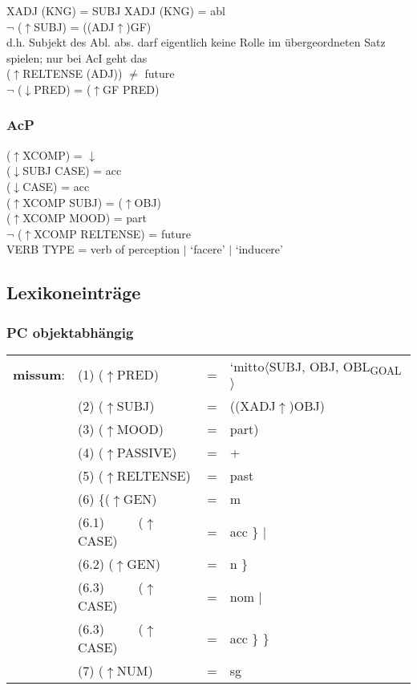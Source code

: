 \documentclass[12pt,a4paper]{article}
\begin{document}
XADJ (KNG) = SUBJ XADJ (KNG) = abl\\
$\neg$ ($\uparrow$SUBJ) = ((ADJ$\uparrow$)GF) \\
d.h. Subjekt des Abl. abs. darf eigentlich keine Rolle im übergeordneten Satz spielen; nur bei AcI geht das\\
($\uparrow$RELTENSE (ADJ)) $\neq$ future \\
$\neg$ ($\downarrow$PRED) = ($\uparrow$GF PRED)\\

\subsubsection{AcP}

($\uparrow$XCOMP) = $\downarrow$\\
($\downarrow$SUBJ CASE) = acc\\
($\downarrow$CASE) = acc\\
($\uparrow$XCOMP SUBJ) = ($\uparrow$OBJ)\\
($\uparrow$XCOMP MOOD) = part\\
$\neg$ ($\uparrow$XCOMP RELTENSE) = future\\
VERB TYPE = verb of perception $\mid$ `facere' $\mid$ `inducere'

\subsection{Lexikoneinträge}

\subsubsection{PC objektabhängig}

\begin{tabular}{ l  l  l  l  } 
\textbf{missum}: & (1) ($\uparrow$PRED) & = & `mitto$\langle$SUBJ, OBJ, OBL\textsubscript{GOAL} $\rangle$\\
$\qquad$ & (2) ($\uparrow$SUBJ) & = & ((XADJ$\uparrow$)OBJ)\\
$\qquad$ & (3) ($\uparrow$MOOD) & = & part)\\
$\qquad$ & (4) ($\uparrow$PASSIVE) & = & + \\
$\qquad$ & (5) ($\uparrow$RELTENSE) & = & past \\
$\qquad$ & (6) \{($\uparrow$GEN) & = & m \\ 
$\qquad$ & (6.1) $\qquad$ ($\uparrow$CASE) & = & acc \} $\mid$\\
$\qquad$ & (6.2) ($\uparrow$GEN) & = & n \} \\
$\qquad$ & (6.3) $\qquad$ ($\uparrow$CASE) & = & nom  $\mid$\\
$\qquad$ & (6.3) $\qquad$ ($\uparrow$CASE) & = & acc \} \} \\
$\qquad$ & (7) ($\uparrow$NUM) & = & sg \\
\end{tabular}
\newline
\newline
\end{document}
